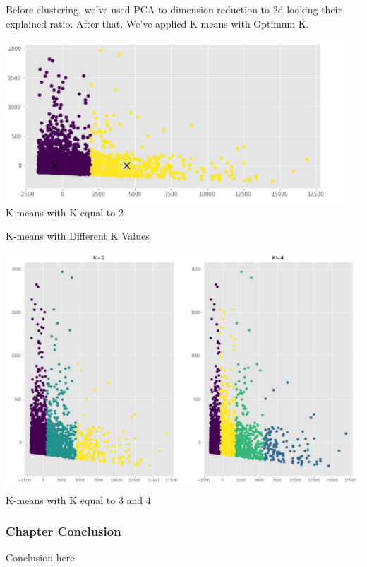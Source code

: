 \documentclass[onecolumn]{article}
\begin{document}
Before clustering, we've used PCA to dimension reduction to 2d looking their explained ratio. After that, We've applied K-means with Optimum K. 

\begin{center}
    \includegraphics[width=.8\textwidth]{1.PNG}\\
    K-means with K equal to 2
\end{center}

K-means with Different K Values

\begin{center}
    \includegraphics[width=.8\textwidth]{2.PNG}\\
    K-means with K equal to 3 and 4
\end{center}

\maketitle


\subsubsection{Chapter Conclusion}

Conclusion here
\end{document}
